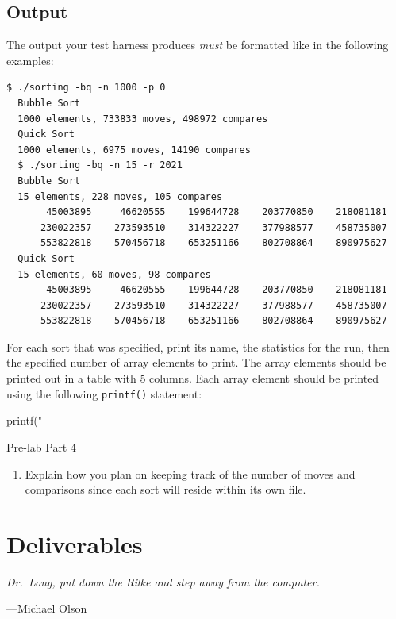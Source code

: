 \documentclass[11pt]{article}
\begin{document}
\subsection{Output}

The output your test harness produces \emph{must} be formatted like in
the following examples:

\begin{lstlisting}[style=bashstyle]
  $ ./sorting -bq -n 1000 -p 0
  Bubble Sort
  1000 elements, 733833 moves, 498972 compares
  Quick Sort
  1000 elements, 6975 moves, 14190 compares
  $ ./sorting -bq -n 15 -r 2021
  Bubble Sort
  15 elements, 228 moves, 105 compares
       45003895     46620555    199644728    203770850    218081181
      230022357    273593510    314322227    377988577    458735007
      553822818    570456718    653251166    802708864    890975627
  Quick Sort
  15 elements, 60 moves, 98 compares
       45003895     46620555    199644728    203770850    218081181
      230022357    273593510    314322227    377988577    458735007
      553822818    570456718    653251166    802708864    890975627
\end{lstlisting}

For each sort that was specified, print its name, the statistics for the
run, then the specified number of array elements to print. The array
elements should be printed out in a table with 5 columns. Each array
element should be printed using the following \texttt{printf()}
statement:

\begin{codelisting}{}
printf("%
\end{codelisting}

\medskip
\begin{prelab}{Pre-lab Part 4}
    \begin{enumerate}
        \item Explain how you plan on keeping track of the number of
          moves and comparisons since each sort will reside within its
          own file.
    \end{enumerate}
\end{prelab}


\section{Deliverables}

\epigraph{\emph{Dr.\ Long, put down the Rilke and step away from the
computer.}}{---Michael Olson}
\end{document}

